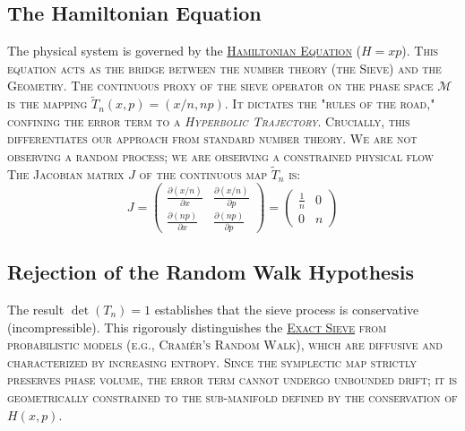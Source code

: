 \documentclass[sn-mathphys-num, pdflatex]{sn-jnl}
\newcommand{\gterm}[2]{\begingroup\normalfont\scshape\hyperlink{#1}{#2}\endgroup}
\begin{document}
\subsection{The Hamiltonian Equation}
The physical system is governed by the \gterm{hamiltonian}{Hamiltonian Equation} ($H=xp$). This equation acts as the bridge between the number theory (the Sieve) and the Geometry. 
The continuous proxy of the sieve operator on the phase space $\mathcal{M}$ is the mapping $\tilde{T}_n(x,p) = (x/n, np)$. 
 It dictates the "rules of the road," confining the error term to a \textit{Hyperbolic Trajectory}. Crucially, this differentiates our approach from standard number theory. We are not observing a random process; we are observing a constrained physical flow 
The Jacobian matrix $J$ of the continuous map $\tilde{T}_n$ is:
\begin{equation}
J = \begin{pmatrix} \frac{\partial(x/n)}{\partial x} & \frac{\partial(x/n)}{\partial p} \\ \frac{\partial(np)}{\partial x} & \frac{\partial(np)}{\partial p} \end{pmatrix} = \begin{pmatrix} \frac{1}{n} & 0 \\ 0 & n \end{pmatrix}
\end{equation}

\subsection{Rejection of the Random Walk Hypothesis}
The result $\det(T_n) = 1$ establishes that the sieve process is conservative (incompressible). This rigorously distinguishes the \gterm{exact_sieve}{Exact Sieve} from probabilistic models (e.g., Cramér's Random Walk), which are diffusive and characterized by increasing entropy. Since the symplectic map strictly preserves phase volume, the error term cannot undergo unbounded drift; it is geometrically constrained to the sub-manifold defined by the conservation of $H(x,p)$.
\end{document}
